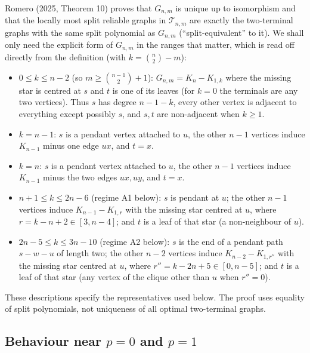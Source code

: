 \documentclass[
  11pt,
]{article}
\providecommand{\tightlist}{%
  \setlength{\itemsep}{0pt}\setlength{\parskip}{0pt}}
\theoremstyle{definition}
\theoremstyle{remark}
\begin{document}
Romero (2025, Theorem 10) proves that \(G_{n,m}\) is unique up to
isomorphism and that the locally most split reliable graphs in
\(\mathcal T_{n,m}\) are exactly the two-terminal graphs with the same
split polynomial as \(G_{n,m}\) (``split-equivalent'' to it). We shall
only need the explicit form of \(G_{n,m}\) in the ranges that matter,
which is read off directly from the definition (with \(k=\binom n2-m\)):

\begin{itemize}
\tightlist
\item
  \(0\le k\le n-2\) (so \(m\ge\binom{n-1}2+1\)): \(G_{n,m}=K_n-K_{1,k}\)
  where the missing star is centred at \(s\) and \(t\) is one of its
  leaves (for \(k=0\) the terminals are any two vertices). Thus \(s\)
  has degree \(n-1-k\), every other vertex is adjacent to everything
  except possibly \(s\), and \(s,t\) are non-adjacent when \(k\ge 1\).
\item
  \(k=n-1\): \(s\) is a pendant vertex attached to \(u\), the other
  \(n-1\) vertices induce \(K_{n-1}\) minus one edge \(ux\), and
  \(t=x\).
\item
  \(k=n\): \(s\) is a pendant vertex attached to \(u\), the other
  \(n-1\) vertices induce \(K_{n-1}\) minus the two edges \(ux,uy\), and
  \(t=x\).
\item
  \(n+1\le k\le 2n-6\) (regime A1 below): \(s\) is pendant at \(u\); the
  other \(n-1\) vertices induce \(K_{n-1}-K_{1,r}\) with the missing
  star centred at \(u\), where \(r=k-n+2\in[3,n-4]\); and \(t\) is a
  leaf of that star (a non-neighbour of \(u\)).
\item
  \(2n-5\le k\le 3n-10\) (regime A2 below): \(s\) is the end of a
  pendant path \(s\!-\!w\!-\!u\) of length two; the other \(n-2\)
  vertices induce \(K_{n-2}-K_{1,r''}\) with the missing star centred at
  \(u\), where \(r''=k-2n+5\in[0,n-5]\); and \(t\) is a leaf of that
  star (any vertex of the clique other than \(u\) when \(r''=0\)).
\end{itemize}

These descriptions specify the representatives used below. The proof
uses equality of split polynomials, not uniqueness of all optimal
two-terminal graphs.

\subsection{\texorpdfstring{Behaviour near \(p=0\) and
\(p=1\)}{Behaviour near p=0 and p=1}}\label{behaviour-near-p0-and-p1}
\end{document}
